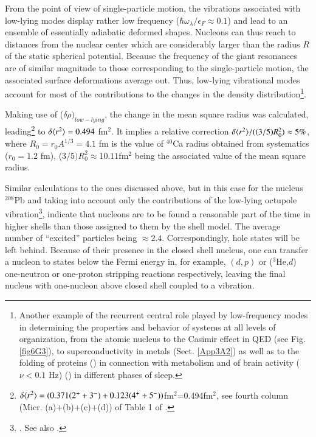 From the point of view of  single-particle motion, the vibrations associated with low-lying modes display rather low frequency ($\hbar\omega_\lambda/\epsilon_F\approx0.1$) and lead to an ensemble of essentially adiabatic deformed shapes. Nucleons can thus reach to distances from the nuclear center which are considerably larger than the radius $R$ of the static spherical potential. Because the frequency of the giant resonances are of similar magnitude to those corresponding to the single-particle motion, the associated surface deformations average out. 
Thus, low-lying vibrational modes  account for most of the contributions to the changes in the density distribution\footnote{\label{f52C1} Another example of the  recurrent central role played by low-frequency modes in determining the properties and behavior of systems at all levels of organization, from the atomic nucleus to the Casimir effect in QED (see Fig. \ref{fig6G3}), to  superconductivity in metals (Sect. \ref{App3A2}) as well as  to the folding of proteins (\cite{Micheletti:04}) in connection with metabolism and of brain  activity ($\nu<0.1$ Hz) (\cite{Mitra:18,Vyazovskiy:13}) in  different phases of sleep.}. 


Making use of  ($\delta\rho)_{low-lying}$, the change in the mean square radius  was calculated, leading\footnote{$\delta\langle {r^2} \rangle=(0.371 (2^++3^-)+0.123(4^++5^-))$fm$^2$=0.494fm$^2$, see fourth column (Micr. (a)+(b)+(c)+(d)) of Table 1 of \cite{Barranco:87a}.} to $\delta\langle {r^2} \rangle=0.494$ fm$^2$. It implies a relative correction $\delta\langle {r^2} \rangle/((3/5)R_0^2)\approx5\%$, where $R_0=r_0A^{1/3}=4.1$ fm is the value of $^{40}$Ca radius obtained from systematics ($r_0=1.2$ fm), ($3/5)R_0^2\approx 10.11$fm$^2$ being the associated value of the mean square radius.

Similar calculations to the ones discussed above, but in this case for the nucleus $^{208}$Pb and taking into account only the contributions of the low-lying octupole vibration\footnote{\cite{Brown:63}. See also \cite{Anderson:62}.}, indicate that nucleons are to be found a reasonable part of the time in higher shells than those assigned to them by the shell model. The average number of ``excited'' particles being $\approx2.4$. 
Correspondingly, hole states will be left behind. Because of their presence  in the closed shell nucleus, one can transfer a nucleon to states below the Fermi energy in, for example, $(d,p)$ or ($^3$He,$d$) one-neutron or one-proton stripping reactions respectively, leaving the final nucleus with one-nucleon above closed shell coupled to a vibration.


